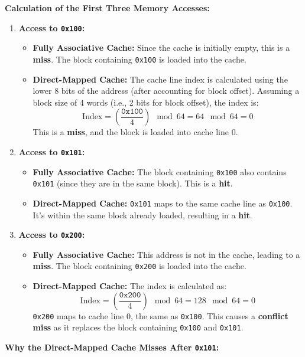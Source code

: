 \textbf{Calculation of the First Three Memory Accesses:}
\begin{enumerate}
    \item \textbf{Access to \texttt{0x100}:}
    \begin{itemize}
        \item \textbf{Fully Associative Cache:} Since the cache is initially empty, this is a \textbf{miss}. The block containing \texttt{0x100} is loaded into the cache.
        \item \textbf{Direct-Mapped Cache:} The cache line index is calculated using the lower 8 bits of the address (after accounting for block offset). Assuming a block size of 4 words (i.e., 2 bits for block offset), the index is:
        \[
        \text{Index} = \left( \frac{\texttt{0x100}}{4} \right) \mod 64 = 64 \mod 64 = 0
        \]
        This is a \textbf{miss}, and the block is loaded into cache line 0.
    \end{itemize}
    \item \textbf{Access to \texttt{0x101}:}
    \begin{itemize}
        \item \textbf{Fully Associative Cache:} The block containing \texttt{0x100} also contains \texttt{0x101} (since they are in the same block). This is a \textbf{hit}.
        \item \textbf{Direct-Mapped Cache:} \texttt{0x101} maps to the same cache line as \texttt{0x100}. It's within the same block already loaded, resulting in a \textbf{hit}.
    \end{itemize}
    \item \textbf{Access to \texttt{0x200}:}
    \begin{itemize}
        \item \textbf{Fully Associative Cache:} This address is not in the cache, leading to a \textbf{miss}. The block containing \texttt{0x200} is loaded into the cache.
        \item \textbf{Direct-Mapped Cache:} The index is calculated as:
        \[
        \text{Index} = \left( \frac{\texttt{0x200}}{4} \right) \mod 64 = 128 \mod 64 = 0
        \]
        \texttt{0x200} maps to cache line 0, the same as \texttt{0x100}. This causes a \textbf{conflict miss} as it replaces the block containing \texttt{0x100} and \texttt{0x101}.
    \end{itemize}
\end{enumerate}

\textbf{Why the Direct-Mapped Cache Misses After \texttt{0x101}:}

